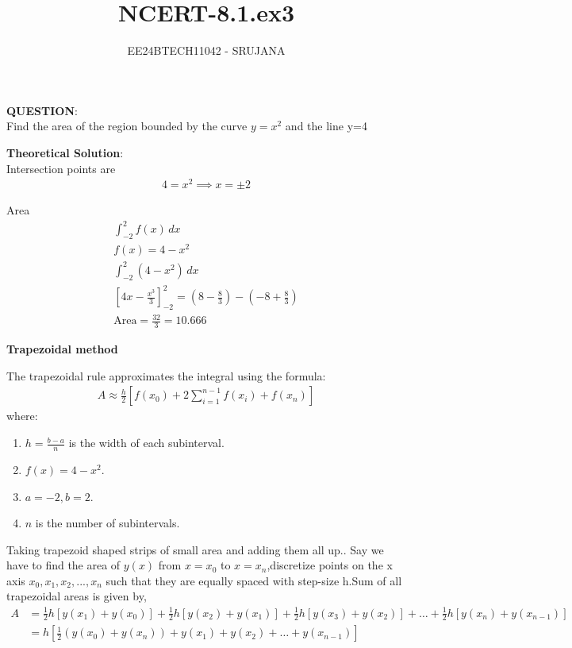 \documentclass[journal]{IEEEtran}
\begin{document}

\vspace{3cm}

\title{NCERT-8.1.ex3}
\author{EE24BTECH11042 - SRUJANA}
{\let\newpage\relax\maketitle}

\renewcommand{\thefigure}{\theenumi}
\renewcommand{\thetable}{\theenumi}
\setlength{\intextsep}{10pt} 

\renewcommand{\thetable}{\theenumi}

\textbf{QUESTION}:\\

Find the area of the region bounded by the curve $y = x^2$ and the line y=4

\textbf{Theoretical Solution}:\\

Intersection points are 
\begin{align}
  4 = x^2 \implies x = \pm 2
\end{align}

Area 
\begin{align}
    \int_{-2}^{2} f(x) \, dx\\
    f(x) = 4 - x^2\\
    \int_{-2}^{2} (4-x^2) \, dx\\
    \left[ 4x - \frac{x^3}{3} \right]_{-2}^2 = \left( 8 - \frac{8}{3} \right) - \left( -8 + \frac{8}{3} \right)\\
    \text{Area} =  \frac{32}{3} = 10.666
\end{align}

\textbf{Trapezoidal method}

The trapezoidal rule approximates the integral using the formula:\\
\begin{align}
    A \approx \frac{h}{2} \left[ f(x_0) + 2 \sum_{i=1}^{n-1} f(x_i) + f(x_n) \right]
\end{align}
where:\\
\begin{enumerate}
   \item $h=\frac{b-a}{n}$ is the width of each subinterval.
   \item $f(x) = 4-x^2$.
   \item $a=-2,b=2$.
   \item $n$ is the number of subintervals.
\end{enumerate}
Taking trapezoid shaped strips of small area and adding them all up.. Say we have to
find the area of $y(x)$ from $x=x_0$ to $x = x_n$,discretize points on the x axis $x_0,x_1,x_2,...,x_n$ such that they are equally spaced with step-size h.Sum of all trapezoidal areas is given by,
\begin{align}
    A &= \frac{1}{2}h\left[y(x_1)+y(x_0)\right]+\frac{1}{2}h\left[y(x_2)+y(x_1)\right]+\frac{1}{2}h\left[y(x_3)+y(x_2)\right]+\dots+\frac{1}{2}h\left[y(x_n)+y(x_{n-1})\right] \\
    &= h\left[\frac{1}{2}\left(y(x_0)+y(x_n)\right)+y(x_1)+y(x_2)+\dots+y(x_{n-1})\right]
\end{align}
\end{document}
